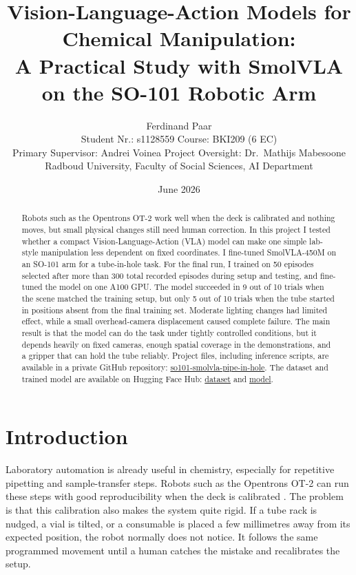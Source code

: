 \documentclass[11pt, a4paper]{article}
\title{Vision-Language-Action Models for Chemical Manipulation:\\
A Practical Study with SmolVLA on the SO-101 Robotic Arm}
\author{
    Ferdinand Paar \\[4pt]
    \small Student Nr.: s1128559 \quad Course: BKI209 (6 EC) \\
    \small Primary Supervisor: Andrei Voinea \quad
    Project Oversight: Dr.\ Mathijs Mabesoone \\
    \small Radboud University, Faculty of Social Sciences, AI Department
}
\date{June 2026}
\begin{document}
\maketitle

\begin{abstract}
Robots such as the Opentrons OT-2 work well when the deck is calibrated and nothing moves, but small physical changes still need human correction. In this project I tested whether a compact Vision-Language-Action (VLA) model can make one simple lab-style manipulation less dependent on fixed coordinates. I fine-tuned SmolVLA-450M on an SO-101 arm for a tube-in-hole task. For the final run, I trained on 50 episodes selected after more than 300 total recorded episodes during setup and testing, and fine-tuned the model on one A100 GPU. The model succeeded in 9 out of 10 trials when the scene matched the training setup, but only 5 out of 10 trials when the tube started in positions absent from the final training set. Moderate lighting changes had limited effect, while a small overhead-camera displacement caused complete failure. The main result is that the model can do the task under tightly controlled conditions, but it depends heavily on fixed cameras, enough spatial coverage in the demonstrations, and a gripper that can hold the tube reliably. Project files, including inference scripts, are available in a private GitHub repository: \href{https://github.com/FerdinandPaar/so101-smolvla-pipe-in-hole}{so101-smolvla-pipe-in-hole}. The dataset and trained model are available on Hugging Face Hub: \href{https://huggingface.co/datasets/mundgelenk/so101_50_pipe_in_hole}{dataset} and \href{https://huggingface.co/mundgelenk/smolvla_so101_pipe_in_hole}{model}.
\end{abstract}

\tableofcontents
\newpage

\section{Introduction}
\label{sec:intro}

Laboratory automation is already useful in chemistry, especially for repetitive pipetting and sample-transfer steps. Robots such as the Opentrons OT-2 can run these steps with good reproducibility when the deck is calibrated \parencite{bolt2025platehandler}. The problem is that this calibration also makes the system quite rigid. If a tube rack is nudged, a vial is tilted, or a consumable is placed a few millimetres away from its expected position, the robot normally does not notice. It follows the same programmed movement until a human catches the mistake and recalibrates the setup.
\end{document}

